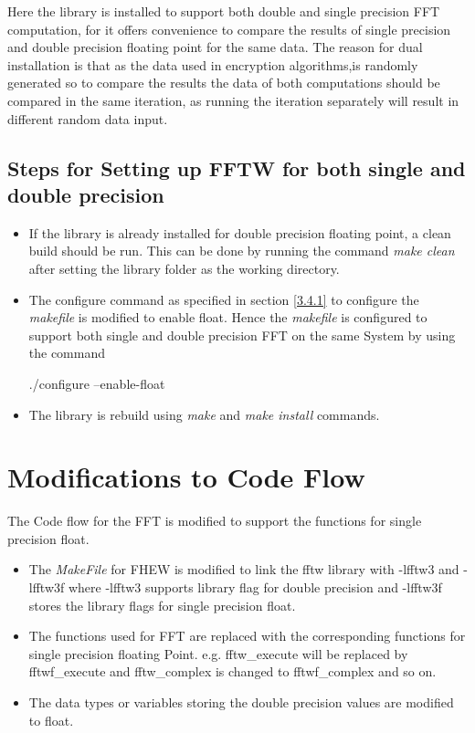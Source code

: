 Here the library is installed to support both double and single precision FFT computation, for it offers convenience to compare the results of single precision and double precision floating point for the same data. The reason for dual installation is that as the data used in encryption algorithms,is randomly generated so to compare the results the data of both computations should be compared in the same iteration, as running the iteration separately will result in different random data input.
\subsection{Steps for Setting up FFTW for both single and double precision}
\begin{itemize}
\item
If the library is already installed for double precision floating point, a clean build should be run. This can be done by running the command \textit{make clean} after setting the library folder as the working directory.
\item
The configure command as specified in section \ref{3.4.1} to configure the \textit{makefile} is modified to enable float. Hence the \textit{makefile} is configured to support both single and double precision FFT on the same System by using the command

\hspace{3cm} ./configure --enable-float
\item
The library is rebuild using \textit{make} and \textit{make install}  commands.
\end{itemize}
\section {Modifications to Code Flow}
The Code flow for the FFT is modified to support the functions for single precision float.
\begin{itemize}
\item
The \textit{MakeFile} for FHEW is modified to link the fftw library with -lfftw3 and -lfftw3f where -lfftw3 supports library flag for double precision and -lfftw3f stores the library flags for single precision float.
\item
The functions used for FFT are replaced with the corresponding functions for single precision floating Point.
e.g. fftw\_execute will be replaced by fftwf\_execute and fftw\_complex is changed to fftwf\_complex and so on.
\item 
The data types or variables storing the double precision values are modified to float.
\end{itemize}

